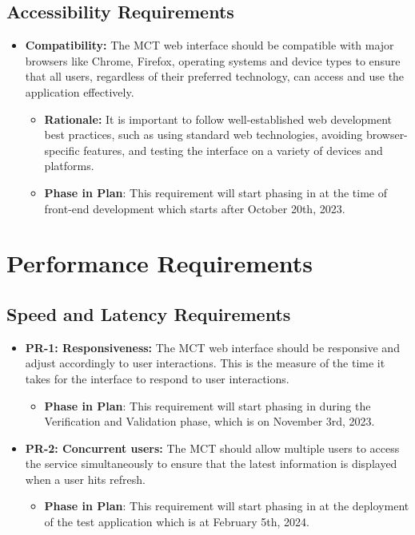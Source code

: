 \documentclass[12pt]{article}
\begin{document}
\subsection{Accessibility Requirements}

\begin{itemize}
    \item \textbf{Compatibility: }The MCT web interface should be compatible with major browsers like Chrome, Firefox, operating systems and device types to ensure that all users, regardless of their preferred technology, can access and use the application effectively.
    \begin{itemize}
        \item \textbf{Rationale: }It is important to follow well-established web development best practices, such as using standard web technologies, avoiding browser-specific features, and testing the interface on a variety of devices and platforms.
        \item \textbf{Phase in Plan}: This requirement will start phasing in at the time of front-end development which starts after October 20th, 2023.
    \end{itemize}
\end{itemize}



\section{Performance Requirements}
\subsection{Speed and Latency Requirements}

\begin{itemize}
    \item \textbf{PR-1: Responsiveness: }The MCT web interface should be responsive and adjust accordingly to user interactions. This is the measure of the time it takes for the interface to respond to user interactions.
    \begin{itemize}
        \item \textbf{Phase in Plan}: This requirement will start phasing in during the Verification and Validation phase, which is on November 3rd, 2023.
    \end{itemize}
    \item \textbf{PR-2: Concurrent users:} The MCT should allow multiple users to access the service simultaneously to ensure that the latest information is displayed when a user hits refresh.
    \begin{itemize}
        \item \textbf{Phase in Plan}: This requirement will start phasing in at the deployment of the test application which is at February 5th, 2024.
    \end{itemize}
\end{itemize}
\end{document}
